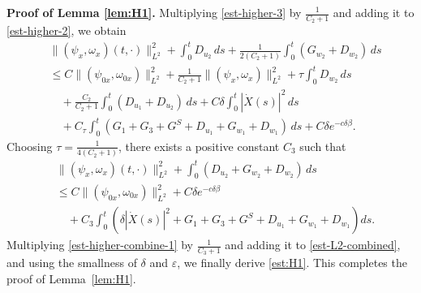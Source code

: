 \documentclass[11pt,reqno]{amsart}
\numberwithin{equation}{section} %
\begin{document}



\noindent \textbf{Proof of Lemma \ref{lem:H1}.} 
Multiplying \eqref{est-higher-3} by $\frac{1}{C_2+1}$ and adding it to \eqref{est-higher-2}, we obtain
\begin{align*}
	&\|(\psi_x,\omega_x)(t,\cdot)\|_{L^2}^2+\int_0^t D_{u_2}\,ds + \frac{1}{2(C_2+1)}\int_0^t (G_{w_2}+D_{w_2})\,ds\\
	&\le C\|(\psi_{0x},\omega_{0x})\|_{L^2}^2 + \frac{1}{C_2+1}\|(\psi_x,\omega_x)\|_{L^2}^2 +\tau\int_0^t D_{w_2}\,ds \\
	&\quad + \frac{C_2}{C_2+1}\int_0^t (D_{u_1}+D_{u_2})\,ds + C\delta\int_0^t|\dot{X}(s)|^2\,ds \\
	&\quad +C_\tau\int_0^t (G_1+G_3+G^S+D_{u_1}+G_{w_1}+D_{w_1})\,ds +C\delta e^{-c\delta\beta}.
\end{align*}
Choosing $\tau = \frac{1}{4(C_2+1)}$, there exists a positive constant $C_3$ such that
\begin{equation} \label{est-higher-combine-1}
\begin{aligned}
&  \|(\psi_x, \omega_x)(t,\cdot)\|_{L^2}^2 + \int_0^t   (D_{u_2}+G_{w_2}+D_{w_2}) \,ds\\
&\le  C \|(\psi_{0x}, \omega_{0x})\|_{L^2}^2 + C \delta e^{-c\delta \beta}  \\
&\quad + C_3 \int_0^t \left(\delta|\dot{X}(s)|^2 + G_1 + G_3 + G^S+ D_{u_1} + G_{w_1} + D_{w_1}   \right) ds.
\end{aligned}
\end{equation}
Multiplying \eqref{est-higher-combine-1} by $\frac{1}{C_3+1}$ and adding it to \eqref{est-L2-combined}, and using the smallness of $\delta$ and $\varepsilon$, we finally derive \eqref{est:H1}. This completes the proof of Lemma~\ref{lem:H1}.
\end{document}
